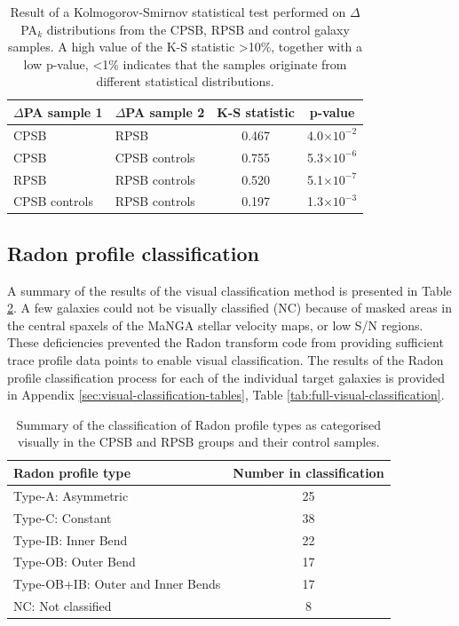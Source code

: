 \begin{table}
\caption[Kolmogorov-Smirnov statistical test of $\Delta$PA distributions]{Result of a Kolmogorov-Smirnov statistical test performed on $\Delta$PA$_{k}$ distributions from the CPSB, RPSB and control galaxy samples. A high value of the K-S statistic \textgreater 10\%, together with a low p-value, \textless 1\% indicates that the samples originate from different statistical distributions.}
\label{tab:K-S-tests}
\begin{tabular}{llcc}
\hline
$\Delta$PA sample 1  & $\Delta$PA sample 2 & K-S statistic & p-value \\
\hline
CPSB & RPSB & 0.467 & 4.0$\times10^{-2}$ \\
CPSB & CPSB controls & 0.755 & 5.3$\times10^{-6}$ \\
RPSB & RPSB controls & 0.520 & 5.1$\times10^{-7}$ \\
CPSB controls & RPSB controls & 0.197 & 1.3$\times10^{-3}$ \\
\hline
\end{tabular}
\end{table}

\subsection{Radon profile classification}
\label{sec:Radon-profile-classification}

A summary of the results of the visual classification method is presented in Table \ref{tab:Radon-class-summary}.  A few galaxies could not be visually classified (NC) because of masked areas in the central spaxels of the MaNGA stellar velocity maps, or low S/N regions. These deficiencies prevented the Radon transform code from providing sufficient trace profile data points to enable visual classification. The results of the Radon profile classification process for each of the individual target galaxies is provided in Appendix \ref{sec:visual-classification-tables}, Table \ref{tab:full-visual-classification}. 

\begin{table}
    \centering
    \caption[Summary of Radon profile type visual classifications]{Summary of the classification of Radon profile types as categorised visually in the CPSB and RPSB groups and their control samples.}
    \label{tab:Radon-class-summary}
    \begin{tabular}{lc}
    \hline
    Radon profile type & Number in classification \\
    \hline
    Type-A: Asymmetric & 25 \\
    Type-C: Constant & 38 \\
    Type-IB: Inner Bend & 22 \\
    Type-OB: Outer Bend & 17 \\
    Type-OB+IB: Outer and Inner Bends & 17 \\
    NC: Not classified & 8 \\
    \hline
    \end{tabular}
\end{table}

